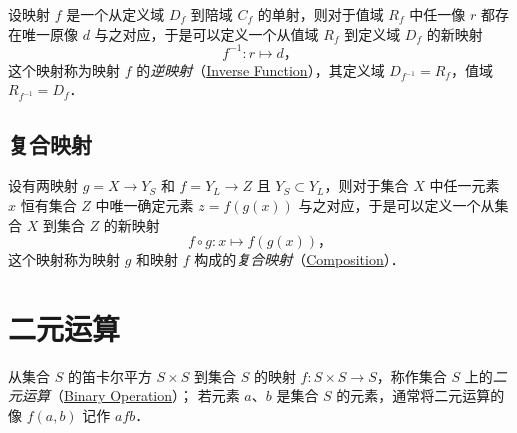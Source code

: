 设映射 $f$ 是一个从定义域 $D_f$ 到陪域 $C_f$ 的单射，则对于值域 $R_f$ 中任一像 $r$ 都存在唯一原像 $d$ 与之对应，于是可以定义一个从值域 $R_f$ 到定义域 $D_f$ 的新映射
\[
f^{-1}: r \mapsto d \text{，}
\]
这个映射称为映射 $f$ 的\emph{逆映射}（\href{http://mathworld.wolfram.com/InverseFunction.html}{Inverse Function}），其定义域 $D_{f^{-1}}=R_f$，值域 $R_{f^{-1}}=D_f$．

\subsection{复合映射}

设有两映射 $g=X\to{}Y_S$ 和 $f=Y_L\to{}Z$ 且 $Y_S\subset{}Y_L$，则对于集合 $X$ 中任一元素 $x$ 恒有集合 $Z$ 中唯一确定元素 $z=f(g(x))$ 与之对应，于是可以定义一个从集合 $X$ 到集合 $Z$ 的新映射
\[
f \circ g: x \mapsto f(g(x)) \text{，}
\]
这个映射称为映射 $g$ 和映射 $f$ 构成的\emph{复合映射}（\href{http://mathworld.wolfram.com/Composition.html}{Composition}）．

\newpage
\section{二元运算}

从集合 $S$ 的笛卡尔平方 $S\times{}S$ 到集合 $S$ 的映射 $f:S\times{}S\to{}S$，称作集合 $S$ 上的\emph{二元运算}（\href{http://mathworld.wolfram.com/BinaryOperation.html}{Binary Operation}）；
若元素 $a$、$b$ 是集合 $S$ 的元素，通常将二元运算的像 $f(a, b)$ 记作 $a f b$．

